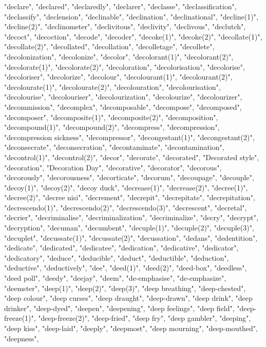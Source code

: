 "declare",
"declared",
"declaredly",
"declarer",
"declasse",
"declassification",
"declassify",
"declension",
"declinable",
"declination",
"declinational",
"decline(1)",
"decline(2)",
"declinometer",
"declivitous",
"declivity",
"declivous",
"declutch",
"decoct",
"decoction",
"decode",
"decoder",
"decoke(1)",
"decoke(2)",
"decollate(1)",
"decollate(2)",
"decollated",
"decollation",
"decolletage",
"decollete",
"decolonization",
"decolonize",
"decolor",
"decolorant(1)",
"decolorant(2)",
"decolorate(1)",
"decolorate(2)",
"decoloration",
"decolorisation",
"decolorise",
"decoloriser",
"decolorize",
"decolour",
"decolourant(1)",
"decolourant(2)",
"decolourate(1)",
"decolourate(2)",
"decolouration",
"decolourisation",
"decolourise",
"decolouriser",
"decolourization",
"decolourize",
"decolourizer",
"decommission",
"decomplex",
"decomposable",
"decompose",
"decomposed",
"decomposer",
"decomposite(1)",
"decomposite(2)",
"decomposition",
"decompound(1)",
"decompound(2)",
"decompress",
"decompression",
"decompression sickness",
"decompressor",
"decongestant(1)",
"decongestant(2)",
"deconsecrate",
"deconsecration",
"decontaminate",
"decontamination",
"decontrol(1)",
"decontrol(2)",
"decor",
"decorate",
"decorated",
"Decorated style",
"decoration",
"Decoration Day",
"decorative",
"decorator",
"decorous",
"decorously",
"decorousness",
"decorticate",
"decorum",
"decoupage",
"decouple",
"decoy(1)",
"decoy(2)",
"decoy duck",
"decrease(1)",
"decrease(2)",
"decree(1)",
"decree(2)",
"decree nisi",
"decrement",
"decrepit",
"decrepitate",
"decrepitation",
"decrescendo(1)",
"decrescendo(2)",
"decrescendo(3)",
"decrescent",
"decretal",
"decrier",
"decriminalise",
"decriminalization",
"decriminalize",
"decry",
"decrypt",
"decryption",
"decuman",
"decumbent",
"decuple(1)",
"decuple(2)",
"decuple(3)",
"decuplet",
"decussate(1)",
"decussate(2)",
"decussation",
"dedans",
"dedentition",
"dedicate",
"dedicated",
"dedicatee",
"dedication",
"dedicative",
"dedicator",
"dedicatory",
"deduce",
"deducible",
"deduct",
"deductible",
"deduction",
"deductive",
"deductively",
"dee",
"deed(1)",
"deed(2)",
"deed-box",
"deedless",
"deed poll",
"deedy",
"deejay",
"deem",
"de-emphasise",
"de-emphasize",
"deemster",
"deep(1)",
"deep(2)",
"deep(3)",
"deep breathing",
"deep-chested",
"deep colour",
"deep curses",
"deep draught",
"deep-drawn",
"deep drink",
"deep drinker",
"deep-dyed",
"deepen",
"deepening",
"deep feelings",
"deep field",
"deep-freeze(1)",
"deep-freeze(2)",
"deep-fried",
"deep fry",
"deep gambler",
"deeping",
"deep kiss",
"deep-laid",
"deeply",
"deepmost",
"deep mourning",
"deep-mouthed",
"deepness",
